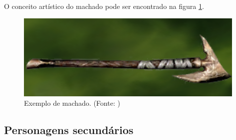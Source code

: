 \begin{itemize}
O conceito artístico do machado pode ser encontrado na figura 
\ref{img:machado}.

\begin{figure}[H]
 \centering
 \includegraphics[scale=1]{Imagens/machado01.png}
 \caption{Exemplo de machado. (Fonte: \cite{bib:jogoinfinity})}
\label{img:machado}
\end{figure}

\end{itemize}

\subsection{Personagens secundários}
